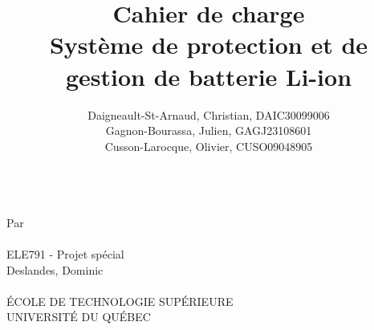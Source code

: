 
\title{
	\textbf{Cahier de charge} \\
	\vspace{2cm}
	Système de protection et de gestion de batterie Li-ion	
	}
\author{
	Daigneault-St-Arnaud, Christian, DAIC30099006 \\
	Gagnon-Bourassa, Julien, GAGJ23108601 \\
	Cusson-Larocque, Olivier, CUSO09048905	
}
\newcommand{\cours}{ELE791 - Projet spécial }
\newcommand{\prof}{Deslandes, Dominic}



\makeatletter
\begin{titlepage}

	
	\thispagestyle{empty}
	\centering
	{\Huge \@title}\\ 
	\vspace{2cm}
	{\large Par \\
		\vspace{0.5cm}
		\@author \\
		\vspace{2cm}
		\cours \\
		\vspace{0.5cm}
		\prof \\
		\vspace{3.0cm}
		\@date \\
		\vspace{3.0cm}
		\'{E}COLE DE TECHNOLOGIE SUP\'{E}RIEURE \\
		UNIVERSIT\'{E} DU QUÉBEC
	}
\end{titlepage}
\makeatother




